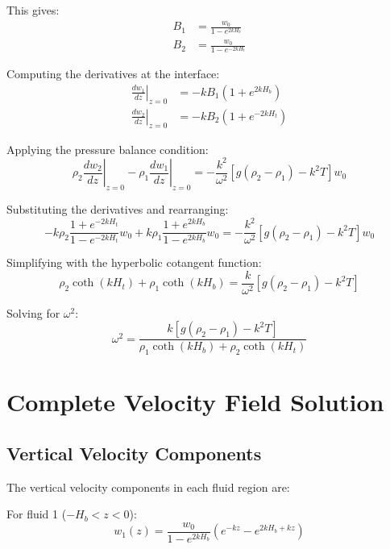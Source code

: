 \documentclass[12pt,a4paper]{article}
\begin{document}
This gives:
\begin{align}
B_1 &= \frac{w_0}{1 - e^{2kH_b}} \\
B_2 &= \frac{w_0}{1 - e^{-2kH_t}}
\end{align}

Computing the derivatives at the interface:
\begin{align}
\left.\frac{dw_1}{dz}\right|_{z=0} &= -kB_1(1 + e^{2kH_b}) \\
\left.\frac{dw_2}{dz}\right|_{z=0} &= -kB_2(1 + e^{-2kH_t})
\end{align}

Applying the pressure balance condition:
\begin{equation}
\rho_2\left.\frac{dw_2}{dz}\right|_{z=0} - \rho_1\left.\frac{dw_1}{dz}\right|_{z=0} = -\frac{k^2}{\omega^2}[g(\rho_2 - \rho_1) - k^2T]w_0
\end{equation}

Substituting the derivatives and rearranging:
\begin{equation}
-k\rho_2\frac{1 + e^{-2kH_t}}{1 - e^{-2kH_t}}w_0 + k\rho_1\frac{1 + e^{2kH_b}}{1 - e^{2kH_b}}w_0 = -\frac{k^2}{\omega^2}[g(\rho_2 - \rho_1) - k^2T]w_0
\end{equation}

Simplifying with the hyperbolic cotangent function:
\begin{equation}
\rho_2\coth(kH_t) + \rho_1\coth(kH_b) = \frac{k}{\omega^2}[g(\rho_2 - \rho_1) - k^2T]
\end{equation}

Solving for $\omega^2$:
\begin{equation}
\omega^2 = \frac{k[g(\rho_2 - \rho_1) - k^2T]}{\rho_1\coth(kH_b) + \rho_2\coth(kH_t)}
\end{equation}

\section{Complete Velocity Field Solution}
\subsection{Vertical Velocity Components}
The vertical velocity components in each fluid region are:

For fluid 1 ($-H_b < z < 0$):
\begin{equation}
w_1(z) = \frac{w_0}{1 - e^{2kH_b}}(e^{-kz} - e^{2kH_b+kz})
\end{equation}
\end{document}
